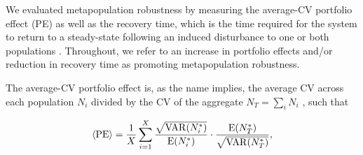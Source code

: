 \documentclass{revtex4}
\begin{document}


\noindent We evaluated metapopulation robustness by measuring the average-CV portfolio effect (PE) \citep{Anderson:2014cx,Schindler:2015gf} as well as the recovery time, which is the time required for the system to return to a steady-state following an induced disturbance to one or both populations \citep{Ovaskainen:2002il}.
Throughout, we refer to an increase in portfolio effects and/or reduction in recovery time as promoting metapopulation robustness.

The average-CV portfolio effect is, as the name implies, the average CV across each population $N_i$ divided by the CV of the aggregate $N_T=\sum_i N_i$ \citep{Anderson:2013gb}, such that

\begin{equation}
\langle{\rm PE}\rangle =\frac{1}{X}\sum_{i=1}^{X} \frac{\sqrt{{\rm VAR}(N_i^*)}}{{\rm E}(N_i^*)}\cdot \frac{{\rm E}(N_T^*)}{\sqrt{{\rm VAR}(N_T^*)}},
\label{eq:pe}
\end{equation}
\end{document}
